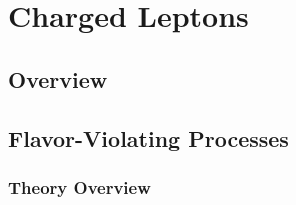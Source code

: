 %

\chapter{Charged Leptons}
\label{chap:charged-leptons}


\begin{center}\begin{boldmath}






\end{boldmath}\end{center}

\makeatletter
\renewcommand{\paragraph}{\@startsection{paragraph}{4}{0ex}%
   {-3.25ex plus -1ex minus -0.2ex}%
   {1.5ex plus 0.2ex}%
   {\normalfont\normalsize\bfseries}}
\makeatother



\tableofcontents

\section{Overview}\label{sec:cl:over}


\section{Flavor-Violating Processes}\label{sec:cl:fv}

\subsection{Theory Overview}\label{sec:cl:fvt}


